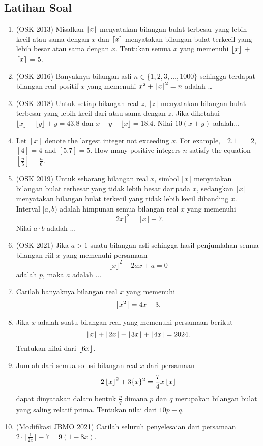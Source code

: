 \documentclass[11pt]{scrartcl}
\begin{document}
\subsection{Latihan Soal}
\begin{enumerate}
    \item (OSK 2013) Misalkan $\left\lfloor x \right\rfloor$ menyatakan bilangan bulat terbesar yang lebih kecil atau sama dengan $x$ dan $\left\lceil x \right\rceil$ menyatakan bilangan bulat terkecil yang lebih besar atau sama dengan $x$. Tentukan semua $x$ yang memenuhi $\left\lfloor x \right\rfloor$ + $\left\lceil x \right\rceil$ = 5.
    
    \item (OSK 2016) Banyaknya bilangan asli $n \in \{1,2,3,\dots,1000\}$ sehingga terdapat bilangan real positif $x$ yang memenuhi $x^2+\left\lfloor x \right\rfloor^2=n$ adalah \dots
    
    \item (OSK 2018) Untuk setiap bilangan real $z$, $\lfloor z \rfloor$ menyatakan bilangan bulat terbesar yang lebih kecil dari atau sama dengan $z$. Jika diketahui $\lfloor x \rfloor + \lfloor y \rfloor + y = 43.8$ dan $x + y - \lfloor x \rfloor = 18.4$. Nilai $10(x + y)$ adalah...
    
    \item Let $[x]$ denote the largest integer not exceeding $x$. For example, $[2.1]=2$, $[4]=4$ and $[5.7]=5$. How many positive integers $n$ satisfy the equation $\left[\frac{n}{5}\right]=\frac{n}{6}$.

    \item (OSK 2019) Untuk sebarang bilangan real $x$, simbol $\lfloor x \rfloor$ menyatakan bilangan bulat terbesar yang tidak lebih besar daripada $x$, sedangkan $\lceil x \rceil$ menyatakan bilangan bulat terkecil yang tidak lebih kecil dibanding $x$. Interval $[a, b)$ adalah himpunan semua bilangan real $x$ yang memenuhi
    $$\lfloor 2x \rfloor^2 = \lceil x \rceil + 7.$$
    Nilai $a \cdot b$ adalah ...

    \item (OSK 2021) Jika $a > 1$ suatu bilangan asli sehingga hasil penjumlahan semua bilangan riil $x$ yang memenuhi persamaan
    $$\lfloor x \rfloor^2 - 2ax + a = 0$$
    adalah $p$, maka $a$ adalah ...

    \item Carilah banyaknya bilangan real $x$ yang memenuhi
    $$\left\lfloor x^2 \right\rfloor=4x+3.$$

    \item Jika $x$ adalah suatu bilangan real yang memenuhi persamaan berikut
    $$\left\lfloor x \right\rfloor+\left\lfloor 2x \right\rfloor+\left\lfloor 3x \right\rfloor+\left\lfloor 4x \right\rfloor=2024.$$
    Tentukan nilai dari $\left\lfloor 6x \right\rfloor$.

    \item Jumlah dari semua solusi bilangan real $x$ dari persamaan
    $$2\left\lfloor x \right\rfloor^2+3\{x\}^2=\frac{7}{4}x\left\lfloor x \right\rfloor$$
    dapat dinyatakan dalam bentuk $\frac{p}{q}$ dimana $p$ dan $q$ merupakan bilangan bulat yang saling relatif prima. Tentukan nilai dari $10p+q$.

    
    \item (Modifikasi JBMO 2021) Carilah seluruh penyelesaian dari persamaan $2\cdot \lfloor{\frac{1}{2x}}\rfloor - 7 = 9(1 - 8x)$.
\end{enumerate}
\end{document}
